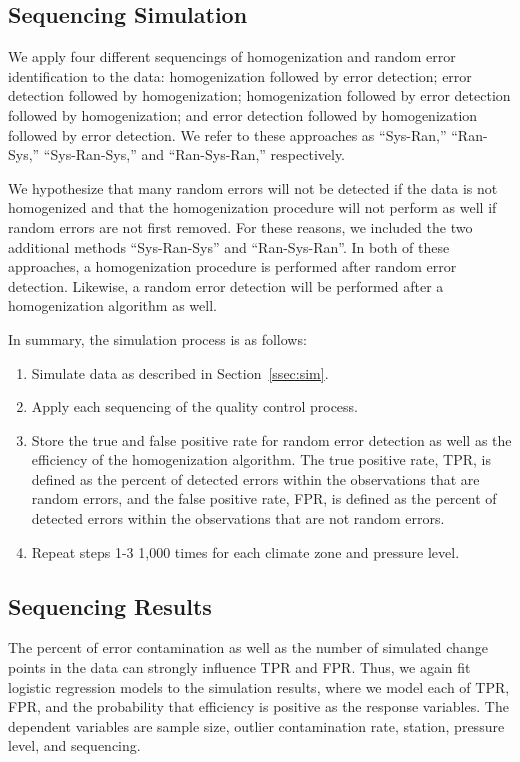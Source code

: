 \documentclass[12pt]{article}
\begin{document}
\begin{doublespacing}
\subsection{Sequencing Simulation}

We apply four different sequencings of homogenization and random error identification to the data: homogenization followed by error detection; error detection followed by homogenization; homogenization followed by error detection followed by homogenization; and error detection followed by homogenization followed by error detection.  We refer to these approaches as ``Sys-Ran,'' ``Ran-Sys,'' ``Sys-Ran-Sys,'' and ``Ran-Sys-Ran,'' respectively.

We hypothesize that many random errors will not be detected if the data is not homogenized and that the homogenization procedure will not perform as well if random errors are not first removed.  For these reasons, we included the two additional methods ``Sys-Ran-Sys'' and ``Ran-Sys-Ran''.  In both of these approaches, a homogenization procedure is performed after random error detection.  Likewise, a random error detection will be performed after a homogenization algorithm as well.

In summary, the simulation process is as follows:

\begin{enumerate}
	\item Simulate data as described in Section~\ref{ssec:sim}.
	\item Apply each sequencing of the quality control process.
	\item Store the true and false positive rate for random error detection as well as the efficiency of the homogenization algorithm.  The true positive rate, TPR, is defined as the percent of detected errors within the observations that are random errors, and the false positive rate, FPR, is defined as the percent of detected errors within the observations that are not random errors.
	\item Repeat steps 1-3 1,000 times for each climate zone and pressure level.
\end{enumerate}

\subsection{Sequencing Results}

The percent of error contamination as well as the number of simulated change points in the data can strongly influence TPR and FPR.  Thus, we again fit logistic regression models to the simulation results, where we model each of TPR, FPR, and the probability that efficiency is positive as the response variables.  The dependent variables are sample size, outlier contamination rate, station, pressure level, and sequencing.


\end{doublespacing}
\end{document}
